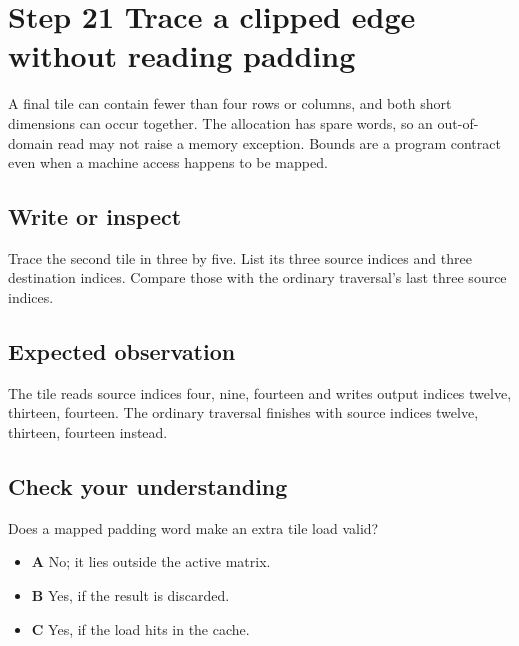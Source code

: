 \section{Step 21 Trace a clipped edge without reading padding}\label{transpose-s21}

A final tile can contain fewer than four rows or columns, and both short dimensions can occur together. The allocation has spare words, so an out-of-domain read may not raise a memory exception. Bounds are a program contract even when a machine access happens to be mapped.

\subsection{Write or inspect}
Trace the second tile in three by five. List its three source indices and three destination indices. Compare those with the ordinary traversal’s last three source indices.

\subsection{Expected observation}
The tile reads source indices four, nine, fourteen and writes output indices twelve, thirteen, fourteen. The ordinary traversal finishes with source indices twelve, thirteen, fourteen instead.

\subsection{Check your understanding}
Does a mapped padding word make an extra tile load valid?

\begin{itemize}
  \item \textbf{A} No; it lies outside the active matrix.
  \item \textbf{B} Yes, if the result is discarded.
  \item \textbf{C} Yes, if the load hits in the cache.
\end{itemize}
